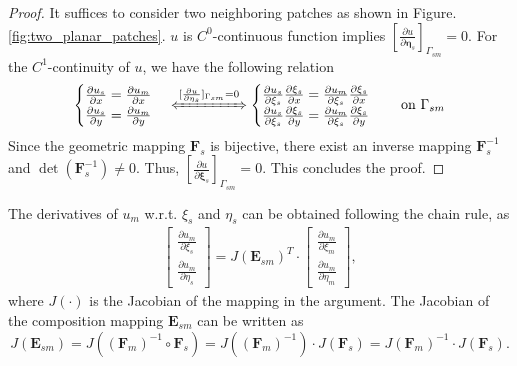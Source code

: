 \documentclass[preprint,12pt]{elsarticle}
\begin{document}
\begin{proof}
    It suffices to consider two neighboring patches as shown in Figure. \ref{fig:two_planar_patches}. $u$ is $C^0$-continuous function implies $[\frac{\partial{u}}{\partial{\mathbf{\eta}_s}}]_{\Gamma_{sm}}=0$. For the $C^1$-continuity of $u$, we have the following relation 
    \begin{align}
        \begin{cases}
            \frac{\partial{u_s}}{\partial{x}}=\frac{\partial{u_m}}{\partial{x}}\\
            \frac{\partial{u_s}}{\partial{y}}=\frac{\partial{u_m}}{\partial{y}}
        \end{cases}
        \xLeftrightarrow{[\frac{\partial{u}}{\partial{\mathbf{\eta}_s}}]_{\Gamma_{sm}}=0}
        \begin{cases}
            \frac{\partial{u}_s}{\partial{\xi_s}}\frac{\partial\xi_s}{\partial{x}}=\frac{\partial{u_m}}{\partial{\xi_s}}\frac{\partial\xi_s}{\partial{x}}\\
            \frac{\partial{u}_s}{\partial{\xi_s}}\frac{\partial\xi_s}{\partial{y}}=\frac{\partial{u_m}}{\partial{\xi_s}}\frac{\partial\xi_s}{\partial{y}}
        \end{cases} \quad \text{on $\Gamma_{sm}$}
    \end{align}
    Since the geometric mapping $\mathbf{F}_s$ is bijective, there exist an inverse mapping $\mathbf{F}_s^{-1}$ and $\det({\mathbf{F}_s^{-1}})\neq{0}$. Thus, $[\frac{\partial{u}}{\partial{\mathbf{\xi}_s}}]_{\Gamma_{sm}}=0$. This concludes the proof.
\end{proof}
The derivatives of $u_m$ w.r.t. $\xi_s$ and $\eta_s$ can be obtained following the chain rule, as
\begin{align}
    \begin{bmatrix}
        \tfrac{\partial{u_m}}{\partial{\xi_s}}\\
        \tfrac{\partial{u_m}}{\partial{\eta_s}}
    \end{bmatrix}
    =
    J(\mathbf{E}_{sm})^T\cdot
    \begin{bmatrix}
        \tfrac{\partial{u_m}}{\partial{\xi_m}}\\
        \tfrac{\partial{u_m}}{\partial{\eta_m}}
    \end{bmatrix},
\end{align}
where $J(\cdot)$ is the Jacobian of the mapping in the argument. The Jacobian of the composition mapping $\mathbf{E}_{sm}$ can be written as
\begin{equation}
    J(\mathbf{E}_{sm})=J(\left(\mathbf{F}_{m}\right)^{-1}\circ\mathbf{F}_{s})=J(\left(\mathbf{F}_{m}\right)^{-1})\cdot{}J(\mathbf{F}_{s})=J(\mathbf{F}_{m})^{-1}\cdot{}J(\mathbf{F}_{s}).
\end{equation}
\end{document}
